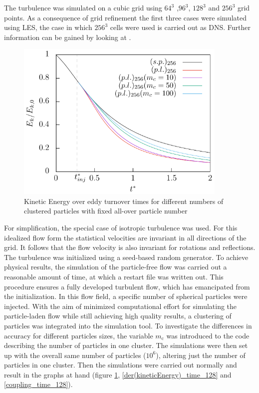\documentclass[11pt,a4paper,openany,oneside,parskip=half*]{article}
\begin{document}
The turbulence was simulated on a cubic grid using $64^3$ ,$96^3$, $128^3$ and $256^3$ grid points. As a consequence of grid refinement the first three cases were simulated using LES, 
the case in which $256^3$ cells were used is carried out as DNS. Further information can be gained by looking at \cite[p. 344-357 for DNS and p. 558-639 for LES]{turbulentFlows}.
\begin{figure}[h]
	\centering
  \includegraphics[width=0.9\textwidth]{./Abbildungen/256/kineticEnergy_time.pdf}
	\caption{Kinetic Energy over eddy turnover times for different numbers of clustered particles with fixed all-over particle number}
	\label{kineticEnergy_time_128}
\end{figure}
\newline
For simplification, the special case of isotropic turbulence was used. For this idealized flow form the statistical 
velocities are invariant in all directions of the grid. It follows that the flow velocity is also invariant for rotations and reflections. 
The turbulence was initialized using a seed-based random generator. To achieve physical results, the simulation of the particle-free flow was carried out a reasonable amount of time, 
at which a restart file was written out. This procedure ensures a fully developed turbulent 
flow, which has emancipated from the initialization. In this flow field, a specific number of spherical particles were injected. 
\newline
With the aim of minimized computational effort for simulating the particle-laden flow while still achieving high quality results, a clustering of particles was integrated into the simulation tool. To investigate the differences in accuracy for different particles sizes, the variable $m_\mathrm{c}$ was introduced to the code describing the number of particles in one cluster. The simulations were then set up with the overall same number of particles ($ 10^6 $), altering just the number of particles in one cluster. Then the simulations were carried out normally and result in the graphs  at hand (figure \ref{kineticEnergy_time_128}, \ref{der(kineticEnergy)_time_128} and \ref{coupling_time_128}). 
\end{document}
